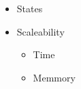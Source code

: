 \documentclass[../../main.tex]{subfiles}
\begin{document}
\begin{itemize}
	\item States
	\item Scaleability
 	\begin{itemize}
 		\item Time
		\item Memmory
 	\end{itemize}
\end{itemize}

	
\end{document}
